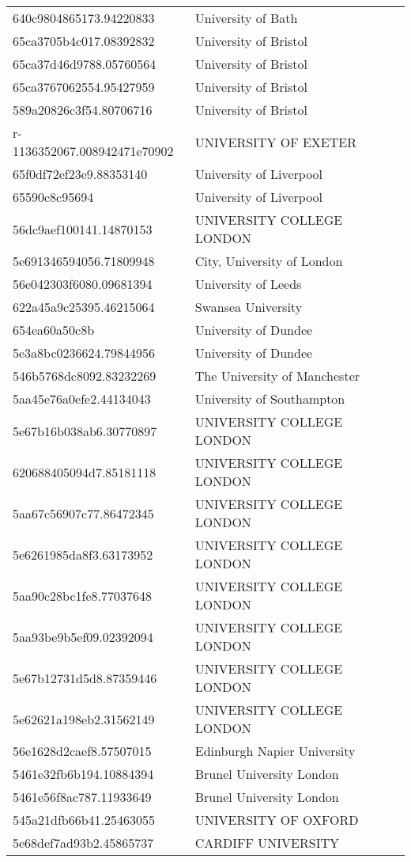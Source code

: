 \begin{tabular}{ll}
640c9804865173.94220833 & University of Bath \\
65ca3705b4c017.08392832 & University of Bristol \\
65ca37d46d9788.05760564 & University of Bristol \\
65ca3767062554.95427959 & University of Bristol \\
589a20826c3f54.80706716 & University of Bristol \\
r-1136352067.008942471e70902 & UNIVERSITY OF EXETER \\
65f0df72ef23e9.88353140 & University of Liverpool \\
65590c8c95694 & University of Liverpool \\
56dc9aef100141.14870153 & UNIVERSITY COLLEGE LONDON \\
5e691346594056.71809948 & City, University of London \\
56e042303f6080.09681394 & University of Leeds \\
622a45a9c25395.46215064 & Swansea University \\
654ea60a50c8b & University of Dundee \\
5e3a8bc0236624.79844956 & University of Dundee \\
546b5768dc8092.83232269 & The University of Manchester \\
5aa45e76a0efe2.44134043 & University of Southampton \\
5e67b16b038ab6.30770897 & UNIVERSITY COLLEGE LONDON \\
620688405094d7.85181118 & UNIVERSITY COLLEGE LONDON \\
5aa67c56907c77.86472345 & UNIVERSITY COLLEGE LONDON \\
5e6261985da8f3.63173952 & UNIVERSITY COLLEGE LONDON \\
5aa90c28bc1fe8.77037648 & UNIVERSITY COLLEGE LONDON \\
5aa93be9b5ef09.02392094 & UNIVERSITY COLLEGE LONDON \\
5e67b12731d5d8.87359446 & UNIVERSITY COLLEGE LONDON \\
5e62621a198eb2.31562149 & UNIVERSITY COLLEGE LONDON \\
56e1628d2caef8.57507015 & Edinburgh Napier University \\
5461e32fb6b194.10884394 & Brunel University London \\
5461e56f8ac787.11933649 & Brunel University London \\
545a21dfb66b41.25463055 & UNIVERSITY OF OXFORD \\
5e68def7ad93b2.45865737 & CARDIFF UNIVERSITY \\

\end{tabular}
